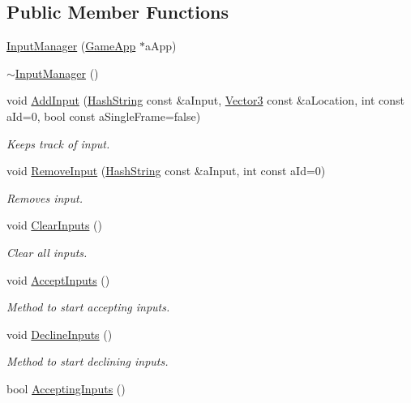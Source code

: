 \subsection*{Public Member Functions}
\begin{DoxyCompactItemize}
\item 
\hyperlink{classInputManager_ae356d129e163107dac792ff3b11e8d21}{Input\+Manager} (\hyperlink{classGameApp}{Game\+App} $\ast$a\+App)
\item 
\hyperlink{classInputManager_af518290877dd183606709d5852db5491}{$\sim$\+Input\+Manager} ()
\item 
void \hyperlink{classInputManager_abb91636f4847e680c93899da9cf357d2}{Add\+Input} (\hyperlink{classHashString}{Hash\+String} const \&a\+Input, \hyperlink{structVector3}{Vector3} const \&a\+Location, int const a\+Id=0, bool const a\+Single\+Frame=false)
\begin{DoxyCompactList}\small\item\em Keeps track of input. \end{DoxyCompactList}\item 
void \hyperlink{classInputManager_a31b15c04ca41dce08f3438ac4a00c51d}{Remove\+Input} (\hyperlink{classHashString}{Hash\+String} const \&a\+Input, int const a\+Id=0)
\begin{DoxyCompactList}\small\item\em Removes input. \end{DoxyCompactList}\item 
void \hyperlink{classInputManager_a1c1f27ef674682cc2e8fc2230fb6e123}{Clear\+Inputs} ()
\begin{DoxyCompactList}\small\item\em Clear all inputs. \end{DoxyCompactList}\item 
void \hyperlink{classInputManager_a62c46df41bf4620e5007cce6a1392b55}{Accept\+Inputs} ()
\begin{DoxyCompactList}\small\item\em Method to start accepting inputs. \end{DoxyCompactList}\item 
void \hyperlink{classInputManager_adb7f0e18632ca0a29f9c0d96d90cbab1}{Decline\+Inputs} ()
\begin{DoxyCompactList}\small\item\em Method to start declining inputs. \end{DoxyCompactList}\item 
bool \hyperlink{classInputManager_a741e1da7192fa3120bd70c737b20d761}{Accepting\+Inputs} ()

\end{DoxyCompactItemize}
